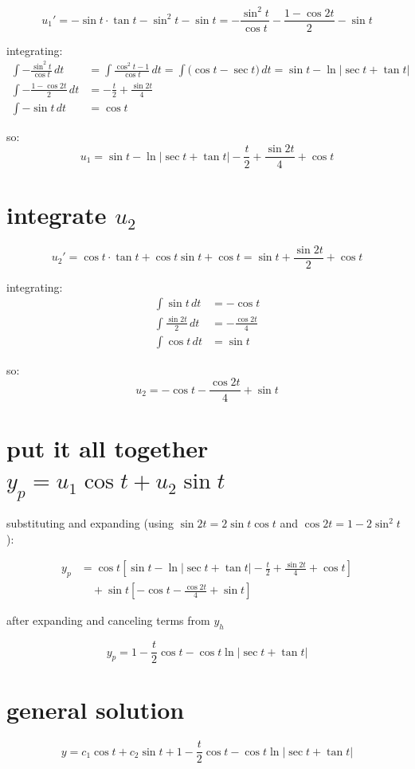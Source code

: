 \documentclass[12pt]{article}
\begin{document}
\[
    u_1' = -\sin t \cdot \tan t - \sin^2 t - \sin t
           = -\frac{\sin^2 t}{\cos t} - \frac{1 - \cos 2t}{2} - \sin t
\]

integrating:
\begin{align*}
    \int -\frac{\sin^2 t}{\cos t}\,dt
        &= \int \frac{\cos^2 t - 1}{\cos t}\,dt
         = \int \bigl(\cos t - \sec t\bigr)\,dt
         = \sin t - \ln|\sec t + \tan t| \\[6pt]
    \int -\frac{1 - \cos 2t}{2}\,dt
        &= -\frac{t}{2} + \frac{\sin 2t}{4} \\[6pt]
    \int -\sin t\,dt
        &= \cos t
\end{align*}

so:
\[
    u_1 = \sin t - \ln|\sec t + \tan t| - \frac{t}{2} + \frac{\sin 2t}{4} + \cos t
\]

\section*{integrate $u_2$}

\[
    u_2' = \cos t \cdot \tan t + \cos t \sin t + \cos t
           = \sin t + \frac{\sin 2t}{2} + \cos t
\]

integrating:
\begin{align*}
    \int \sin t\,dt &= -\cos t \\[6pt]
    \int \frac{\sin 2t}{2}\,dt &= -\frac{\cos 2t}{4} \\[6pt]
    \int \cos t\,dt &= \sin t
\end{align*}

so:
\[
    u_2 = -\cos t - \frac{\cos 2t}{4} + \sin t
\]

\section*{put it all together $y_p = u_1 \cos t + u_2 \sin t$}

substituting and expanding (using $\sin 2t = 2\sin t \cos t$ and $\cos 2t = 1 - 2\sin^2 t$):

\begin{align*}
    y_p &= \cos t \!\left[\sin t - \ln|\sec t + \tan t| - \tfrac{t}{2} + \tfrac{\sin 2t}{4} + \cos t\right] \\
        &\quad + \sin t \!\left[-\cos t - \tfrac{\cos 2t}{4} + \sin t\right]
\end{align*}

after expanding and canceling terms from $y_h$

\[
    \boxed{y_p = 1 - \frac{t}{2}\cos t - \cos t \ln|\sec t + \tan t|}
\]

\section*{general solution}

\[
    y = c_1 \cos t + c_2 \sin t + 1 - \frac{t}{2}\cos t - \cos t \ln|\sec t + \tan t|
\]
\end{document}
